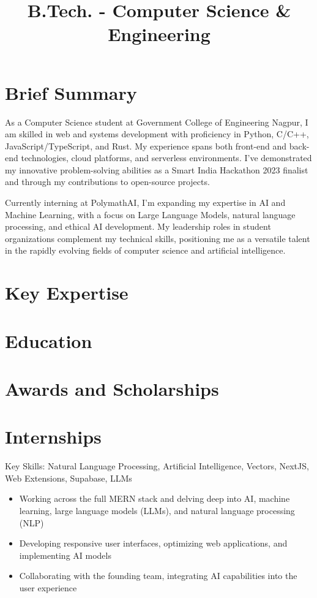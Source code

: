 \documentclass[11pt,a4paper,sans]{moderncv}
\title{B.Tech. - Computer Science \& Engineering}
\newcommand{\customsection}[1]{%
  \section{\textcolor{color1}{\textbf{#1}}}%
}
\begin{document}
\makecvtitle

\customsection{Brief Summary}
As a Computer Science student at Government College of Engineering Nagpur, I am skilled in web and systems development with proficiency in Python, C/C++, JavaScript/TypeScript, and Rust. My experience spans both front-end and back-end technologies, cloud platforms, and serverless environments. I've demonstrated my innovative problem-solving abilities as a Smart India Hackathon 2023 finalist and through my contributions to open-source projects.

Currently interning at PolymathAI, I'm expanding my expertise in AI and Machine Learning, with a focus on Large Language Models, natural language processing, and ethical AI development. My leadership roles in student organizations complement my technical skills, positioning me as a versatile talent in the rapidly evolving fields of computer science and artificial intelligence.

\customsection{Key Expertise}

\customsection{Education}

\customsection{Awards and Scholarships}

\customsection{Internships}
{Key Skills: Natural Language Processing, Artificial Intelligence, Vectors, NextJS, Web Extensions, Supabase, LLMs
\begin{itemize}
\item Working across the full MERN stack and delving deep into AI, machine learning, large language models (LLMs), and natural language processing (NLP)
\item Developing responsive user interfaces, optimizing web applications, and implementing AI models
\item Collaborating with the founding team, integrating AI capabilities into the user experience
\end{itemize}}
\end{document}

